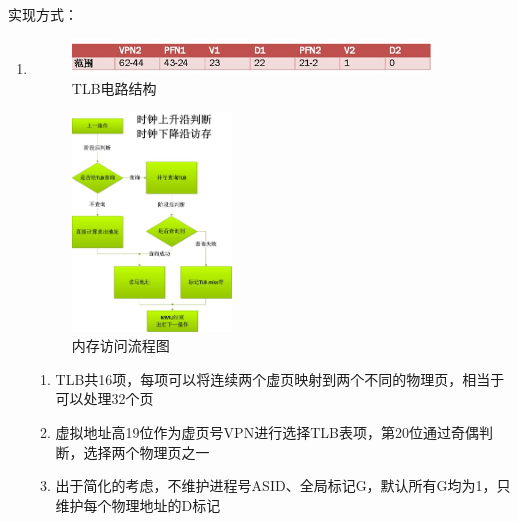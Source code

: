             实现方式：
            \begin{enumerate}
            \item
                \begin{figure}[!hbp]
                    \centering
                    \caption{TLB电路结构}
                    \includegraphics[width=0.9\textwidth]{chart/TLB.jpg}
                \end{figure}

                \begin{figure}[!hbp]
                    \centering
                    \caption{内存访问流程图}
                    \includegraphics[width=0.4\textwidth]{chart/Memory.jpg}
                \end{figure}
                
                \begin{enumerate}
                \item
                    TLB共16项，每项可以将连续两个虚页映射到两个不同的物理页，相当于可以处理32个页
                \item
                    虚拟地址高19位作为虚页号VPN进行选择TLB表项，第20位通过奇偶判断，选择两个物理页之一
                \item
                    出于简化的考虑，不维护进程号ASID、全局标记G，默认所有G均为1，只维护每个物理地址的D标记
                \end{enumerate}


\end{enumerate}
